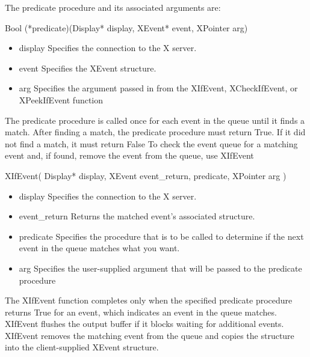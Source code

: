 \documentclass{report}
\begin{document}
\begin{itemize}
            \bigbreak \noindent 
            The predicate procedure and its associated arguments are:
            \bigbreak \noindent 
            \begin{cppcode}
            Bool (*predicate)(Display* display, XEvent* event, XPointer arg)
            \end{cppcode}
            \begin{itemize}
                \item display Specifies the connection to the X server.
                \item event Specifies the XEvent structure.
                \item arg Specifies the argument passed in from the XIfEvent, XCheckIfEvent, or XPeekIfEvent function
            \end{itemize}
            The predicate procedure is called once for each event in the queue until it finds a match. After finding a match, the predicate procedure must return True. If it did not find a match, it must return False
            \bigbreak \noindent 
            To check the event queue for a matching event and, if found, remove the event from the queue, use XIfEvent
            \bigbreak \noindent 
            \begin{cppcode}
                XIfEvent(
                    Display* display,
                    XEvent event_return,
                    predicate,
                    XPointer arg
                )
            \end{cppcode}
            \begin{itemize}
                \item display Specifies the connection to the X server.
                \item event_return Returns the matched event’s associated structure.
                \item predicate Specifies the procedure that is to be called to determine if the next event in the queue matches what you want.
                \item arg Specifies the user-supplied argument that will be passed to the predicate procedure
            \end{itemize}
            The XIfEvent function completes only when the specified predicate procedure returns True for an event, which indicates an event in the queue matches. XIfEvent flushes the output buffer if it blocks waiting for additional events. XIfEvent removes the matching event from the queue and copies the structure into the client-supplied XEvent structure.

\end{itemize}
\end{document}
